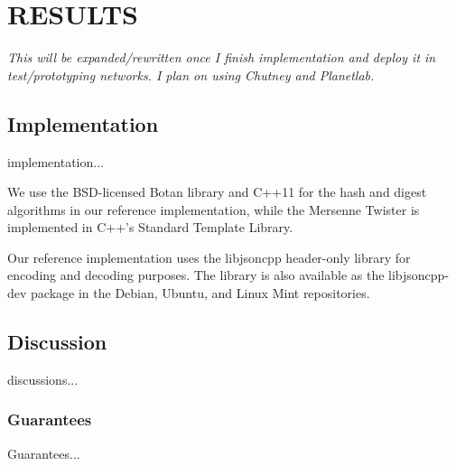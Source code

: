 
\chapter{RESULTS}

\emph{This will be expanded/rewritten once I finish implementation and deploy it in test/prototyping networks. I plan on using Chutney and Planetlab.}

\section{Implementation}

implementation...

We use the BSD-licensed Botan library and C++11 for the hash and digest algorithms in our reference implementation, while the Mersenne Twister is implemented in C++'s Standard Template Library.

Our reference implementation uses the libjsoncpp header-only library for encoding and decoding purposes. The library is also available as the libjsoncpp-dev package in the Debian, Ubuntu, and Linux Mint repositories.

\section{Discussion}

discussions...

\subsection{Guarantees}

Guarantees...